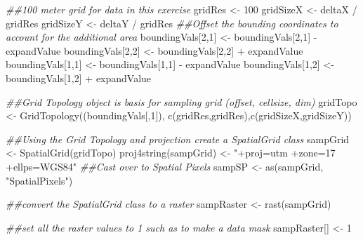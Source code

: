 \documentclass[
  letterpaper,
]{book}
\newenvironment{Shaded}{\begin{snugshade}}{\end{snugshade}}
\newcommand{\DecValTok}[1]{\textcolor[rgb]{0.68,0.00,0.00}{#1}}
\newcommand{\DocumentationTok}[1]{\textcolor[rgb]{0.37,0.37,0.37}{\textit{#1}}}
\newcommand{\FunctionTok}[1]{\textcolor[rgb]{0.28,0.35,0.67}{#1}}
\newcommand{\NormalTok}[1]{\textcolor[rgb]{0.00,0.23,0.31}{#1}}
\newcommand{\OtherTok}[1]{\textcolor[rgb]{0.00,0.23,0.31}{#1}}
\newcommand{\SpecialCharTok}[1]{\textcolor[rgb]{0.37,0.37,0.37}{#1}}
\newcommand{\StringTok}[1]{\textcolor[rgb]{0.13,0.47,0.30}{#1}}
\begin{document}
\begin{Shaded}
\begin{Highlighting}[]
\DocumentationTok{\#\#100 meter grid for data in this exercise}
\NormalTok{gridRes }\OtherTok{\textless{}{-}} \DecValTok{100}
\NormalTok{gridSizeX }\OtherTok{\textless{}{-}}\NormalTok{ deltaX }\SpecialCharTok{/}\NormalTok{ gridRes}
\NormalTok{gridSizeY }\OtherTok{\textless{}{-}}\NormalTok{ deltaY }\SpecialCharTok{/}\NormalTok{ gridRes}
\DocumentationTok{\#\#Offset the bounding coordinates to account for the additional area}
\NormalTok{boundingVals[}\DecValTok{2}\NormalTok{,}\DecValTok{1}\NormalTok{] }\OtherTok{\textless{}{-}}\NormalTok{ boundingVals[}\DecValTok{2}\NormalTok{,}\DecValTok{1}\NormalTok{] }\SpecialCharTok{{-}}\NormalTok{ expandValue}
\NormalTok{boundingVals[}\DecValTok{2}\NormalTok{,}\DecValTok{2}\NormalTok{] }\OtherTok{\textless{}{-}}\NormalTok{ boundingVals[}\DecValTok{2}\NormalTok{,}\DecValTok{2}\NormalTok{] }\SpecialCharTok{+}\NormalTok{ expandValue}
\NormalTok{boundingVals[}\DecValTok{1}\NormalTok{,}\DecValTok{1}\NormalTok{] }\OtherTok{\textless{}{-}}\NormalTok{ boundingVals[}\DecValTok{1}\NormalTok{,}\DecValTok{1}\NormalTok{] }\SpecialCharTok{{-}}\NormalTok{ expandValue}
\NormalTok{boundingVals[}\DecValTok{1}\NormalTok{,}\DecValTok{2}\NormalTok{] }\OtherTok{\textless{}{-}}\NormalTok{ boundingVals[}\DecValTok{1}\NormalTok{,}\DecValTok{2}\NormalTok{] }\SpecialCharTok{+}\NormalTok{ expandValue}

\DocumentationTok{\#\#Grid Topology object is basis for sampling grid (offset, cellsize, dim)}
\NormalTok{gridTopo }\OtherTok{\textless{}{-}} \FunctionTok{GridTopology}\NormalTok{((boundingVals[,}\DecValTok{1}\NormalTok{]), }\FunctionTok{c}\NormalTok{(gridRes,gridRes),}\FunctionTok{c}\NormalTok{(gridSizeX,gridSizeY))}

\DocumentationTok{\#\#Using the Grid Topology and projection create a SpatialGrid class}
\NormalTok{sampGrid }\OtherTok{\textless{}{-}} \FunctionTok{SpatialGrid}\NormalTok{(gridTopo)}
\FunctionTok{proj4string}\NormalTok{(sampGrid) }\OtherTok{\textless{}{-}} \StringTok{"+proj=utm +zone=17 +ellps=WGS84"}
\DocumentationTok{\#\#Cast over to Spatial Pixels}
\NormalTok{sampSP }\OtherTok{\textless{}{-}} \FunctionTok{as}\NormalTok{(sampGrid, }\StringTok{"SpatialPixels"}\NormalTok{)}

\DocumentationTok{\#\#convert the SpatialGrid class to a raster}
\NormalTok{sampRaster }\OtherTok{\textless{}{-}} \FunctionTok{rast}\NormalTok{(sampGrid)}

\DocumentationTok{\#\#set all the raster values to 1 such as to make a data mask}
\NormalTok{sampRaster[] }\OtherTok{\textless{}{-}} \DecValTok{1}


\end{Highlighting}
\end{Shaded}
\end{document}
